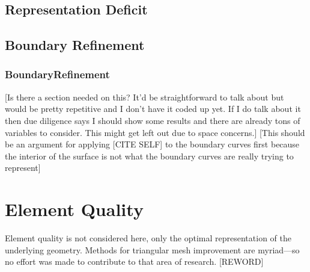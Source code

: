 \subsection{Representation Deficit}






\subsection{Boundary Refinement}
\subsubsection{BoundaryRefinement}
[Is there a section needed on this? It'd be straightforward to talk about
but would be pretty repetitive and I don't have it coded up yet. If I do
talk about it then due diligence says I should show some results and
there are already tons of variables to consider. This might get left out
due to space concerns.]
[This should be an argument for applying [CITE SELF] to the boundary
curves first because the interior of the surface is not what the
boundary curves are really trying to represent]

\section{Element Quality}
Element quality is not considered here, only the optimal representation
of the underlying geometry. Methods for triangular mesh improvement are
myriad---so no effort was made to contribute to that area of research.
[REWORD]
